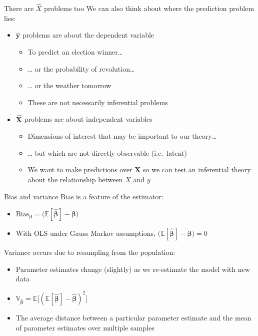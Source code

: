 \documentclass[
  ignorenonframetext,
]{beamer}
\begin{document}
\begin{frame}{There are \(\hat{X}\) problems too}
\protect\hypertarget{there-are-hatx-problems-too}{}
We can also think about where the prediction problem lies:

\begin{itemize}
\item
  \(\bm{\hat{y}}\) problems are about the dependent variable

  \begin{itemize}
  \item
    To predict an election winner\ldots{}
  \item
    \ldots{} or the probability of revolution\ldots{}
  \item
    \ldots{} or the weather tomorrow
  \item
    These are not necessarily inferential problems
  \end{itemize}
\item
  \(\bm{\hat{X}}\) problems are about independent variables

  \begin{itemize}
  \item
    Dimensions of interest that may be important to our theory\ldots{}
  \item
    \ldots{} but which are not directly observable (i.e.~latent)
  \item
    We want to make predictions over \(\bm{X}\) so we can test an
    inferential theory about the relationship between \(X\) and \(y\)
  \end{itemize}
\end{itemize}
\end{frame}

\begin{frame}{Bias and variance}
\protect\hypertarget{bias-and-variance}{}
Bias is a feature of the estimator:

\begin{itemize}
\item
  \(\text{Bias}_{\bm{\beta}} = \big(\mathbb{E}[\bm{\hat{\beta}}] - \bm{\beta}\big)\)
\item
  With OLS under Gauss Markov assumptions,
  \(\big(\mathbb{E}[\bm{\hat{\beta}}] - \bm{\beta}\big) = 0\)
\end{itemize}

Variance occurs due to resampling from the population:

\begin{itemize}
\item
  Parameter estimates change (slightly) as we re-estimate the model with
  new data
\item
  \(\mathbb{V}_{\bm{\hat{\beta}}} = \mathbb{E}\big[(\mathbb{E}[\bm{\hat{\beta}}] - \bm{\hat{\beta}})^2\big]\)
\item
  The average distance between a particular parameter estimate and the
  mean of parameter estimates over multiple samples
\end{itemize}
\end{frame}
\end{document}
